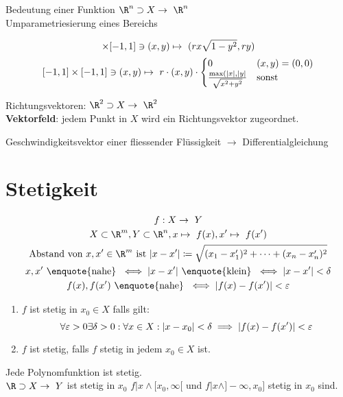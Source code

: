 Bedeutung einer Funktion $\R^n \supset X \rightarrow \R^n$\\
Umparametriesierung eines Bereichs\\
\begin{bsp*}[note = {Kreisscheibe $\subset \R^2 , x^2 + y^2 \leq r^2$}]
	\begin{gather*}
		[-1,1] \times [-1,1] \ni (x,y) \mapsto ( r x \sqrt{1-y^2} , r y )\\
		[-1,1] \times [-1,1] \ni (x,y) \mapsto r \cdot (x,y) \cdot \begin{cases}
			0									&(x,y) = (0,0)	\\
			\frac{\max( \abs{x} , \abs{y}}{\sqrt{x^2 + y^2}}	&\text{sonst}			
		\end{cases}
	\end{gather*}
\end{bsp*}
\begin{bsp*}[note = linearer Koordinatenwechsel]
\end{bsp*}

Richtungsvektoren:
$\R^2 \supset X \rightarrow \R^2$\\
\textbf{Vektorfeld}: jedem Punkt in $X$ wird ein Richtungsvektor zugeordnet.\\
\begin{bsp*}
	Geschwindigkeitsvektor einer fliessender Flüssigkeit $\rightarrow$ Differentialgleichung
\end{bsp*}

\section{Stetigkeit}
\begin{gather*}
	f: X \rightarrow Y \\
	X \subset \R^m , Y \subset \R^n , x \mapsto f(x) , x' \mapsto f(x')\\
	\text{Abstand von } x, x' \in \R ^m \text{ ist } \abs{x-x'} \coloneqq \sqrt{(x_1 - x'_1)^2 + \dots + (x_n - x'_n)^2} \\
	x, x' \text{ \enquote{nahe} } \iff \abs{x-x'} \text{ \enquote{klein} } \iff \abs{x-x'} < \delta \\
	f(x), f(x') \text{ \enquote{nahe} } \iff \abs{f(x) - f(x')} < \epsilon
\end{gather*}
\begin{def*}[note = Stetigkeit , index = Stetigkeit]
	\begin{enumerate}[label=(\alph*)]
		\item $f$ ist stetig in $x_0 \in X$ falls gilt:
			\[ \forall \epsilon > 0 \exists \delta > 0 : \forall x \in X : \abs{x-x_0} < \delta \implies \abs{f(x) - f(x')} < \epsilon \]
		\item $f$ ist stetig, falls $f$ stetig in jedem $x_0 \in X$ ist.
	\end{enumerate}
\end{def*}
\begin{fakt}
	Jede Polynomfunktion ist stetig. \\
	$\R \supset X \rightarrow Y$ ist stetig in $x_0$ \gdw $f|x \wedge [x_0,\infty[$ und $f|x \wedge ]-\infty,x_0]$ stetig in $x_0$ sind.
\end{fakt}

